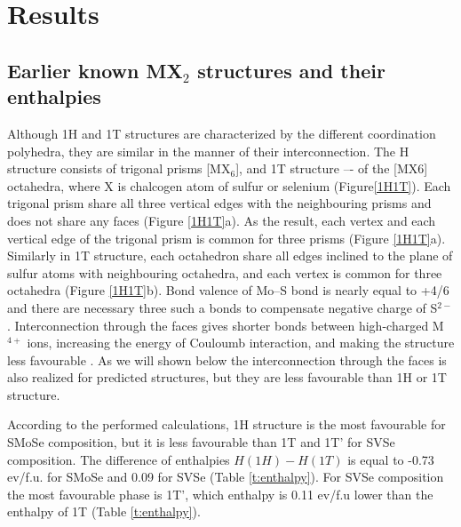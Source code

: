 \documentclass[a4paperm]{article}
\begin{document}
			\section{Results}

\subsection*{Earlier known MX$_2$ structures and their enthalpies}

Although 1H and 1T structures are characterized by the different coordination polyhedra, they are similar in the manner of their interconnection.
The H structure consists of trigonal prisms [MX$_6$], and 1T structure –- of the [MX6] octahedra, where X is chalcogen atom of sulfur or selenium (Figure\ref{1H1T}).
Each trigonal prism share all three vertical edges with the neighbouring prisms and does not share any faces (Figure \ref{1H1T}a).
As the result, each vertex and each vertical edge of the trigonal prism is common for three prisms (Figure \ref{1H1T}a).
Similarly in 1T structure, each octahedron share all edges inclined to the plane of sulfur atoms with neighbouring octahedra, and each vertex is common for three octahedra (Figure \ref{1H1T}b).
Bond valence of Mo--S bond is nearly equal to +4/6 and there are necessary three such a bonds to compensate negative charge of S$^{2-}$.
Interconnection through the faces gives shorter bonds between high-charged M$^{4+}$ ions, increasing the energy of Couloumb interaction, and making the structure less favourable \cite{pauling1929}.
As we will shown below the interconnection through the faces is also realized for predicted structures, but they are less favourable than 1H or 1T structure.

According to the performed calculations, 1H structure is the most favourable for SMoSe composition, but it is less favourable than 1T and 1T' for SVSe composition.
The difference of enthalpies $H(1H)-H(1T)$ is equal to -0.73 ev/f.u. for SMoSe and 0.09 for SVSe (Table \ref{t:enthalpy}).
For SVSe composition the most favourable phase is 1T', which enthalpy is 0.11 ev/f.u lower than the enthalpy of 1T (Table \ref{t:enthalpy}). 
\end{document}
